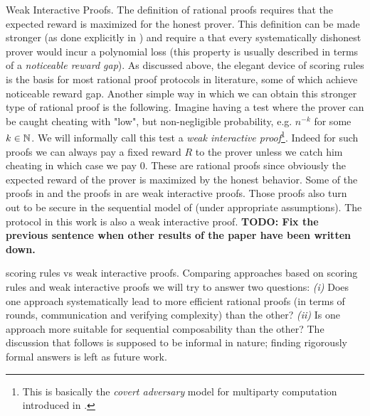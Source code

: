 \medskip
\noindent
{\sc Weak Interactive Proofs.}
The definition of rational proofs requires that the expected reward is maximized for the honest prover. This definition can be made stronger (as done explicitly in \cite{ratargs}) and require a that every systematically dishonest prover would incur a polynomial loss (this property is usually described in terms of a \textit{noticeable reward gap}). As discussed above, the elegant device of scoring rules is the basis for most rational proof protocols in literature, some of which achieve noticeable reward gap. Another simple way in which we can obtain this stronger type of rational proof is the following. Imagine having a test where the prover can be caught cheating with "low", but non-negligible probability, e.g. $n^{-k}$ for some $k \in \mathbb{N}$.
We will informally call this test a \textit{weak interactive proof}\footnote{This is basically the {\em covert adversary} model for multiparty computation introduced in \cite{AL10}.}. Indeed for such proofs we can always pay a fixed reward $R$ to the prover unless we catch him cheating in which case we pay $0$. These are rational proofs since obviously the expected reward of the prover is maximized by the honest behavior. Some of the proofs in \cite{am} and the proofs in \cite{cg15} are weak interactive proofs. Those proofs also turn out to be secure in the sequential model of \cite{cg15} (under appropriate assumptions). The protocol in this work is also a weak interactive proof. \textbf{TODO: Fix the previous sentence when other results of the paper have been written down.}

\medskip
\noindent
{\sc scoring rules vs weak interactive proofs.}
Comparing approaches based on scoring rules and weak interactive proofs we will try to answer two questions:
\textit{(i)} Does one approach systematically lead to more efficient rational proofs (in terms of rounds, communication and verifying complexity) than the other? 
\textit{(ii)} Is one approach more suitable for sequential composability than the other?
The discussion that follows is supposed to be informal in nature; finding rigorously formal answers is left as future work.

